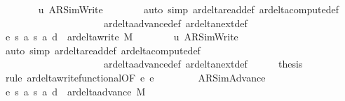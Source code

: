 \begin{isabellebody}
\ \ \ \ \ \ \isamarkupfalse%
\ u{}\ AR{\isacharunderscore}{\kern0pt}SimWrite\isanewline
\ \ \ \ \ \ \isamarkupfalse%
\ {\isacharparenleft}{\kern0pt}auto\ simp{\isacharcolon}{\kern0pt}\ ar{\isacharunderscore}{\kern0pt}delta{\isacharunderscore}{\kern0pt}read{\isacharunderscore}{\kern0pt}def\ ar{\isacharunderscore}{\kern0pt}delta{\isacharunderscore}{\kern0pt}compute{\isacharunderscore}{\kern0pt}def\isanewline
\ \ \ \ \ \ \ \ \ \ \ \ \ \ \ \ \ \ \ \ \ ar{\isacharunderscore}{\kern0pt}delta{\isacharunderscore}{\kern0pt}advance{\isacharunderscore}{\kern0pt}def\ ar{\isacharunderscore}{\kern0pt}delta{\isacharunderscore}{\kern0pt}next{\isacharunderscore}{\kern0pt}def{\isacharparenright}{\kern0pt}\isanewline
\ \ \ \ \isamarkupfalse%
\ e{}{\isacharcolon}{\kern0pt}\ {\isachardoublequoteopen}{\isacharparenleft}{\kern0pt}s{\isacharcomma}{\kern0pt}\ a{\isacharcomma}{\kern0pt}\ s{}{\isacharcomma}{\kern0pt}\ a{}{\isacharcomma}{\kern0pt}\ d{}{\isacharparenright}{\kern0pt}\ {\isasymin}\ ar{\isacharunderscore}{\kern0pt}delta{\isacharunderscore}{\kern0pt}write\ M{\isachardoublequoteclose}\isanewline
\ \ \ \ \ \ \isamarkupfalse%
\ u{}\ AR{\isacharunderscore}{\kern0pt}SimWrite\isanewline
\ \ \ \ \ \ \isamarkupfalse%
\ {\isacharparenleft}{\kern0pt}auto\ simp{\isacharcolon}{\kern0pt}\ ar{\isacharunderscore}{\kern0pt}delta{\isacharunderscore}{\kern0pt}read{\isacharunderscore}{\kern0pt}def\ ar{\isacharunderscore}{\kern0pt}delta{\isacharunderscore}{\kern0pt}compute{\isacharunderscore}{\kern0pt}def\isanewline
\ \ \ \ \ \ \ \ \ \ \ \ \ \ \ \ \ \ \ \ \ ar{\isacharunderscore}{\kern0pt}delta{\isacharunderscore}{\kern0pt}advance{\isacharunderscore}{\kern0pt}def\ ar{\isacharunderscore}{\kern0pt}delta{\isacharunderscore}{\kern0pt}next{\isacharunderscore}{\kern0pt}def{\isacharparenright}{\kern0pt}\isanewline
\ \ \ \ \isamarkupfalse%
\ {\isacharquery}{\kern0pt}thesis\ \isamarkupfalse%
\ {\isacharparenleft}{\kern0pt}rule\ ar{\isacharunderscore}{\kern0pt}delta{\isacharunderscore}{\kern0pt}write{\isacharunderscore}{\kern0pt}functional{\isacharbrackleft}{\kern0pt}OF\ e{}\ e{}{\isacharbrackright}{\kern0pt}{\isacharparenright}{\kern0pt}\isanewline
\ \ \isamarkupfalse%
\isanewline
\ \ \ \ \isamarkupfalse%
\ AR{\isacharunderscore}{\kern0pt}SimAdvance\isanewline
\ \ \ \ \isamarkupfalse%
\ e{}{\isacharcolon}{\kern0pt}\ {\isachardoublequoteopen}{\isacharparenleft}{\kern0pt}s{\isacharcomma}{\kern0pt}\ a{\isacharcomma}{\kern0pt}\ s{}{\isacharcomma}{\kern0pt}\ a{}{\isacharcomma}{\kern0pt}\ d{}{\isacharparenright}{\kern0pt}\ {\isasymin}\ ar{\isacharunderscore}{\kern0pt}delta{\isacharunderscore}{\kern0pt}advance\ M{\isachardoublequoteclose}\isanewline

\end{isabellebody}
